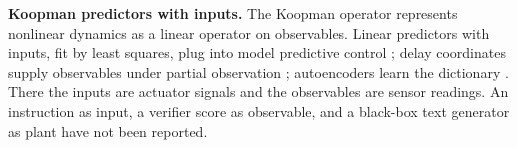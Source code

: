 \textbf{Koopman predictors with inputs.}
The Koopman operator represents nonlinear dynamics as a linear operator on observables.
Linear predictors with inputs, fit by least squares, plug into model predictive control \citep{proctor2016dmdc, korda2018koopman}; delay coordinates supply observables under partial observation \citep{arbabi2017hankel, brunton2017havok}; autoencoders learn the dictionary \citep{lusch2018deepkoopman, enyeart2024koopmanae}.
There the inputs are actuator signals and the observables are sensor readings.
An instruction as input, a verifier score as observable, and a black-box text generator as plant have not been reported.
